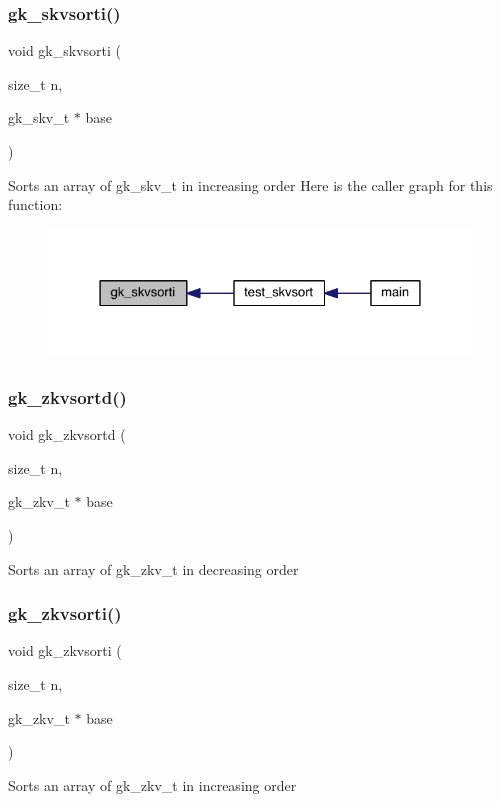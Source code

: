 \subsubsection{\texorpdfstring{gk\+\_\+skvsorti()}{gk\_skvsorti()}}
{\footnotesize\ttfamily void gk\+\_\+skvsorti (\begin{DoxyParamCaption}\item[{size\+\_\+t}]{n,  }\item[{gk\+\_\+skv\+\_\+t $\ast$}]{base }\end{DoxyParamCaption})}

Sorts an array of gk\+\_\+skv\+\_\+t in increasing order Here is the caller graph for this function\+:\nopagebreak
\begin{figure}[H]
\begin{center}
\leavevmode
\includegraphics[width=328pt]{a00140_ab75cbfb8dbe418fab354f124992d7c70_icgraph}
\end{center}
\end{figure}
\mbox{\label{a00140_af837cf83cd77a2232ee7204561d028b1}} 
\subsubsection{\texorpdfstring{gk\+\_\+zkvsortd()}{gk\_zkvsortd()}}
{\footnotesize\ttfamily void gk\+\_\+zkvsortd (\begin{DoxyParamCaption}\item[{size\+\_\+t}]{n,  }\item[{gk\+\_\+zkv\+\_\+t $\ast$}]{base }\end{DoxyParamCaption})}

Sorts an array of gk\+\_\+zkv\+\_\+t in decreasing order \mbox{\label{a00140_a39e869c6f637d2a3cbe92e89f2495d39}} 
\subsubsection{\texorpdfstring{gk\+\_\+zkvsorti()}{gk\_zkvsorti()}}
{\footnotesize\ttfamily void gk\+\_\+zkvsorti (\begin{DoxyParamCaption}\item[{size\+\_\+t}]{n,  }\item[{gk\+\_\+zkv\+\_\+t $\ast$}]{base }\end{DoxyParamCaption})}

Sorts an array of gk\+\_\+zkv\+\_\+t in increasing order 